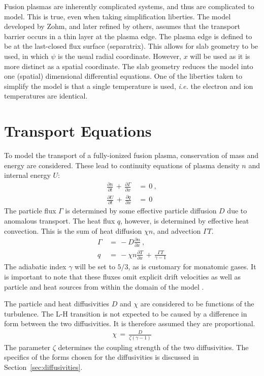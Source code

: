Fusion plasmas are inherently complicated systems, and thus are complicated to model. This is true, even when taking simplification liberties.
The model developed by Zohm, and later refined by others, assumes that the transport barrier occurs in a thin layer at the plasma edge.
The plasma edge is defined to be at the last-closed flux surface (separatrix).
This allows for slab geometry to be used, in which $\psi$ is the usual radial coordinate.
However, $x$ will be used as it is more distinct as a spatial coordinate.
The slab geometry reduces the model into one (spatial) dimensional differential equations.
One of the liberties taken to simplify the model is that a single temperature is used, \emph{i.e.} the electron and ion temperatures are identical.\todo{\color{red}{Liberties?}}

\section{Transport Equations}\label{sec:transport_eqs}
To model the transport of a fully-ionized fusion plasma, conservation of mass and energy are considered.
These lead to continuity equations of plasma density $n$ and internal energy $U$:
\begin{align} %
	\frac{\partial n}{\partial t} \,+\, \frac{\partial \Gamma}{\partial x} \,&=\, 0~,\label{eq:n_continuity} \\
	\frac{\partial U}{\partial t} \,+\, \frac{\partial q}{\partial x} \,&=\, 0\label{eq:U_continuity}
\end{align}
The particle flux $\Gamma$ is determined by some effective particle diffusion $D$ due to anomalous transport.
The heat flux $q$, however, is determined by effective heat convection.
This is the sum of heat diffusion $\chi n$, and advection $\Gamma T$. \todo{\color{red}{Check this statement}}
\begin{align} %
	\Gamma \,&=\, -D \frac{\partial n}{\partial x}~,\label{eq:particle_flux} \\
	q \,&=\, -\chi n \frac{\partial T}{\partial x} \,+\, \frac{\Gamma T}{\gamma - 1} \label{eq:heat_flux}
\end{align}
The adiabatic index $\gamma$ will be set to $5/3$, as is customary for monatomic gases.
It is important to note that these fluxes omit explicit drift velocities as well as particle and heat sources from within the domain of the model \cite{zohm_dynamic_1994}.

The particle and heat diffusivities $D$ and $\chi$ are considered to be functions of the turbulence.
The L-H transition is not expected to be caused by a difference in form between the two diffusivities.
It is therefore assumed they are proportional.
\begin{align} %
	\chi \,=\, \frac{D}{\zeta (\gamma - 1)} \label{eq:heat_particle_diff_relation}
\end{align}
The parameter $\zeta$ determines the coupling strength of the two diffusivities. The specifics of the forms chosen for the diffusivities is discussed in Section~\ref{sec:diffusivities}.

